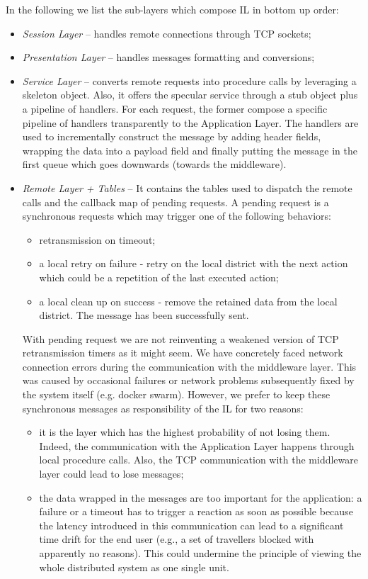 In the following we list the sub-layers which compose IL in
bottom up order:

\begin{itemize}
  \item \textit{Session Layer} --
  handles remote connections through TCP sockets;
  \item \textit{Presentation Layer} --
  handles messages formatting and conversions;
  \item \textit{Service Layer} --
  converts remote requests into procedure calls
  by leveraging a skeleton object.
  Also, it offers the specular service through a stub object plus a pipeline
  of handlers. For each request, the former compose a specific pipeline
  of handlers transparently to the Application Layer.
  The handlers are used to incrementally construct the message by adding
  header fields, wrapping the data into a payload field and finally putting
  the message in the first queue which goes downwards (towards the middleware).
  \item \textit{Remote Layer + Tables} --
  It contains the tables used
  to dispatch the remote calls and the callback map of pending requests.
  A pending request is a synchronous requests which may trigger one of
  the following behaviors:
  \begin{itemize}
  	\item retransmission on timeout;
  	\item a local retry on failure - retry on the local district with
  	the next action which could be a repetition of the last executed action;
  	\item a local clean up on success - remove the retained data from the local
  	district. The message has been successfully sent.
  \end{itemize}
  With pending request we are not reinventing a weakened version
  of TCP retransmission timers as it might seem.
  We have concretely faced network connection errors during the communication
  with the middleware layer. This was caused by occasional failures or network
  problems subsequently fixed by the system itself (e.g. docker swarm). However,
  we prefer to keep these synchronous messages as responsibility of the IL
  for two reasons:
  \begin{itemize}
  	\item it is the layer which has the highest probability of not losing them.
  	Indeed, the communication with the Application Layer happens through
  	local procedure
  	calls. Also, the TCP communication with the middleware layer could lead to
  	lose messages;
  	\item the data wrapped in the messages are too important for the
  	application: a failure
  	or a timeout has to trigger a reaction as soon as possible because
  	the latency introduced in this communication can lead to a significant
  	time drift for the end user (e.g., a set of travellers blocked with
  	apparently no reasons). This could undermine the principle of viewing the
  	whole distributed system as one single unit.
  \end{itemize}
\end{itemize}